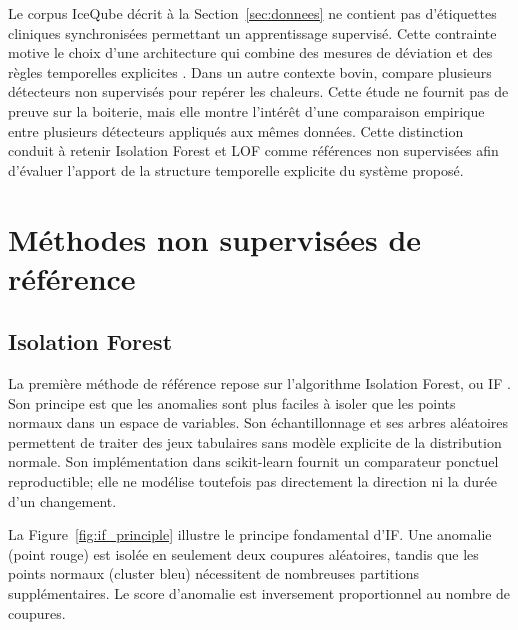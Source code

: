 Le corpus IceQube décrit à la Section~\ref{sec:donnees} ne contient pas d'étiquettes cliniques
synchronisées permettant un apprentissage supervisé. Cette contrainte motive le choix d'une
architecture qui combine des mesures de déviation et des règles temporelles explicites
\citep{chandola2009anomaly,palma2025scoping}. Dans un autre contexte bovin,
\citet{michelena2025comparative} compare plusieurs détecteurs non supervisés pour repérer les
chaleurs. Cette étude ne fournit pas de preuve sur la boiterie, mais elle montre l'intérêt
d'une comparaison empirique entre plusieurs détecteurs appliqués aux mêmes données. Cette
distinction conduit à retenir Isolation Forest et LOF comme références non supervisées afin
d'évaluer l'apport de la structure temporelle explicite du système proposé.

\section{Méthodes non supervisées de référence}

\subsection{Isolation Forest}
La première méthode de référence repose sur l'algorithme Isolation Forest, ou IF
\citep{liu2008isolation}. Son principe est que les anomalies sont plus faciles à isoler que
les points normaux dans un
espace de variables. Son échantillonnage et ses arbres aléatoires permettent de traiter des
jeux tabulaires sans modèle explicite de la distribution normale. Son implémentation dans
scikit-learn \citep{sklearn_api} fournit un comparateur ponctuel
reproductible; elle ne modélise toutefois pas directement la direction ni la durée d'un
changement.

La Figure~\ref{fig:if_principle} illustre le principe fondamental d'IF. Une anomalie
(point rouge) est isolée en seulement deux coupures aléatoires, tandis que les points
normaux (cluster bleu) nécessitent de nombreuses partitions supplémentaires. Le score
d'anomalie est inversement proportionnel au nombre de coupures.

